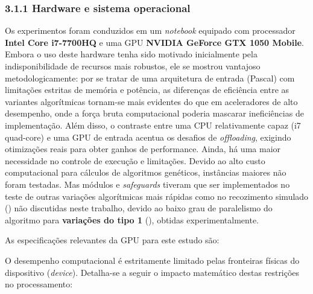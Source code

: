 \subsubsection{3.1.1 Hardware e sistema
operacional}\label{sec-311-hardware-software}

Os experimentos foram conduzidos em um \emph{notebook} equipado com
processador \textbf{Intel Core i7-7700HQ} e uma GPU \textbf{NVIDIA
GeForce GTX 1050 Mobile}. Embora o uso deste hardware tenha sido
motivado inicialmente pela indisponibilidade de recursos mais robustos,
ele se mostrou vantajoso metodologicamente: por se tratar de uma
arquitetura de entrada (Pascal) com limitações estritas de memória e
potência, as diferenças de eficiência entre as variantes algorítmicas
tornam-se mais evidentes do que em aceleradores de alto desempenho, onde
a força bruta computacional poderia mascarar ineficiências de
implementação. Além disso, o contraste entre uma CPU relativamente capaz
(i7 quad-core) e uma GPU de entrada acentua os desafios de
\emph{offloading}, exigindo otimizações reais para obter ganhos de
performance. Ainda, há uma maior necessidade no controle de execução e
limitações. Devido ao alto custo computacional para cálculos de
algoritmos genéticos, instâncias maiores não foram testadas. Mas módulos
e \emph{safeguards} tiveram que ser implementados no teste de outras
variações algorítmicas mais rápidas como no recozimento simulado
() não discutidas neste trabalho,
devido ao baixo grau de paralelismo do algoritmo para \textbf{variações
do tipo 1} (), obtidas
experimentalmente.

As especificações relevantes da GPU para este estudo são:

O desempenho computacional é estritamente limitado pelas fronteiras
físicas do dispositivo (\emph{device}). Detalha-se a seguir o impacto
matemático destas restrições no processamento:

